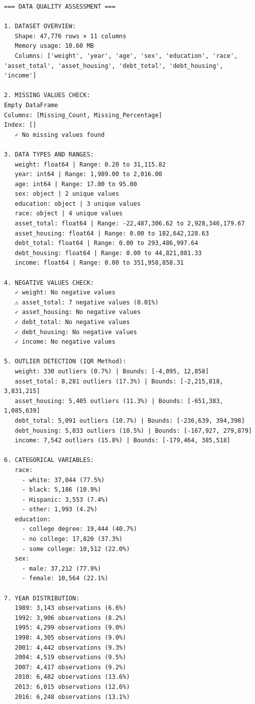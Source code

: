 \documentclass[
  letterpaper,
  DIV=11,
  numbers=noendperiod]{scrartcl}
\begin{document}
\begin{verbatim}
=== DATA QUALITY ASSESSMENT ===

1. DATASET OVERVIEW:
   Shape: 47,776 rows × 11 columns
   Memory usage: 10.60 MB
   Columns: ['weight', 'year', 'age', 'sex', 'education', 'race', 'asset_total', 'asset_housing', 'debt_total', 'debt_housing', 'income']

2. MISSING VALUES CHECK:
Empty DataFrame
Columns: [Missing_Count, Missing_Percentage]
Index: []
   ✓ No missing values found

3. DATA TYPES AND RANGES:
   weight: float64 | Range: 0.20 to 31,115.82
   year: int64 | Range: 1,989.00 to 2,016.00
   age: int64 | Range: 17.00 to 95.00
   sex: object | 2 unique values
   education: object | 3 unique values
   race: object | 4 unique values
   asset_total: float64 | Range: -22,487,306.62 to 2,928,346,179.67
   asset_housing: float64 | Range: 0.00 to 182,642,128.63
   debt_total: float64 | Range: 0.00 to 293,486,997.64
   debt_housing: float64 | Range: 0.00 to 44,821,081.33
   income: float64 | Range: 0.00 to 351,958,858.31

4. NEGATIVE VALUES CHECK:
   ✓ weight: No negative values
   ⚠️ asset_total: 7 negative values (0.01%)
   ✓ asset_housing: No negative values
   ✓ debt_total: No negative values
   ✓ debt_housing: No negative values
   ✓ income: No negative values

5. OUTLIER DETECTION (IQR Method):
   weight: 330 outliers (0.7%) | Bounds: [-4,095, 12,858]
   asset_total: 8,281 outliers (17.3%) | Bounds: [-2,215,818, 3,831,215]
   asset_housing: 5,405 outliers (11.3%) | Bounds: [-651,383, 1,085,639]
   debt_total: 5,091 outliers (10.7%) | Bounds: [-236,639, 394,398]
   debt_housing: 5,033 outliers (10.5%) | Bounds: [-167,927, 279,879]
   income: 7,542 outliers (15.8%) | Bounds: [-179,464, 385,518]

6. CATEGORICAL VARIABLES:
   race:
     - white: 37,044 (77.5%)
     - black: 5,186 (10.9%)
     - Hispanic: 3,553 (7.4%)
     - other: 1,993 (4.2%)
   education:
     - college degree: 19,444 (40.7%)
     - no college: 17,820 (37.3%)
     - some college: 10,512 (22.0%)
   sex:
     - male: 37,212 (77.9%)
     - female: 10,564 (22.1%)

7. YEAR DISTRIBUTION:
   1989: 3,143 observations (6.6%)
   1992: 3,906 observations (8.2%)
   1995: 4,299 observations (9.0%)
   1998: 4,305 observations (9.0%)
   2001: 4,442 observations (9.3%)
   2004: 4,519 observations (9.5%)
   2007: 4,417 observations (9.2%)
   2010: 6,482 observations (13.6%)
   2013: 6,015 observations (12.6%)
   2016: 6,248 observations (13.1%)


\end{verbatim}
\end{document}
